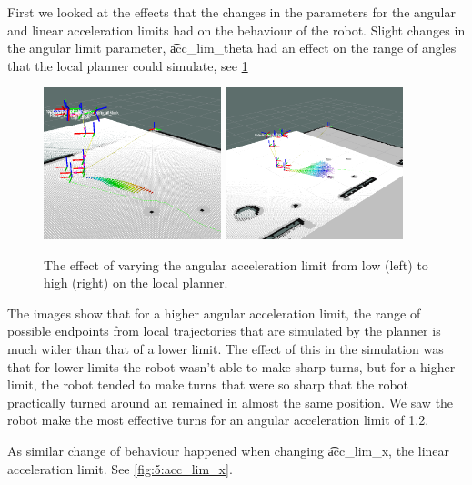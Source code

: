 First we looked at the effects that the changes in the parameters for the angular and linear acceleration limits had on the behaviour of the robot. Slight changes in the angular limit parameter, \t{acc_lim_theta} had an effect on the range of angles that the local planner could simulate, see \cref{fig:5:acc_lim_theta}

\begin{figure}
	\centering
	\includegraphics[width=0.46\textwidth]{./img/smallangularA}
	\includegraphics[width=0.46\textwidth]{./img/highangularA}
	\caption{The effect of varying the angular acceleration limit from low (left) to high (right) on the local planner.}
	\label{fig:5:acc_lim_theta}
\end{figure}

The images show that for a higher angular acceleration limit, the range of possible endpoints from local trajectories that are simulated by the planner is much wider than that of a lower limit. The effect of this in the simulation was that for lower limits the robot wasn't able to make sharp turns, but for a higher limit, the robot tended to make turns that were so sharp that the robot practically turned around an remained in almost the same position. We saw the robot make the most effective turns for an angular acceleration limit of 1.2.

As similar change of behaviour happened when changing \t{acc_lim_x}, the linear acceleration limit. See \cref{fig:5:acc_lim_x}.

